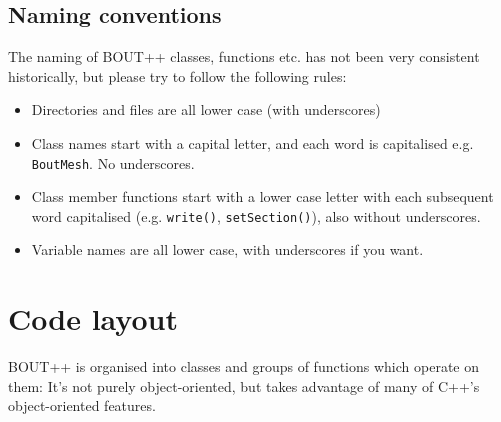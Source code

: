 \documentclass[12pt]{article}
\newcommand{\code}[1]{\texttt{#1}}
\begin{document}
\subsection{Naming conventions}

The naming of BOUT++ classes, functions etc. has not been very consistent
historically, but please try to follow the following rules:
\begin{itemize}
\item Directories and files are all lower case (with underscores)
\item Class names start with a capital letter, and each word is capitalised e.g. \code{BoutMesh}. No underscores.
\item Class member functions start with a lower case letter with each subsequent word capitalised (e.g. \code{write()}, \code{setSection()}), also without underscores.
\item Variable names are all lower case, with underscores if you want.
\end{itemize}

\section{Code layout}

BOUT++ is organised into classes and groups of functions which operate on them: 
It's not purely object-oriented, but takes advantage of many of C++'s object-oriented features. 
\end{document}
